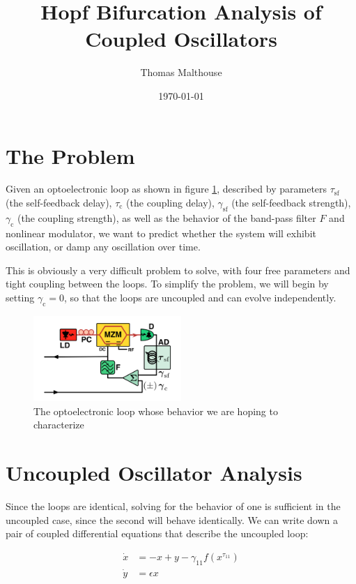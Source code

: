 \documentclass{article}
\title{Hopf Bifurcation Analysis of Coupled Oscillators}
\author{Thomas Malthouse}
\date{\today}
\newcommand{\self}{{\text{sf}}}
\begin{document}
    \maketitle

    \tableofcontents

    \section{The Problem}

    Given an optoelectronic loop as shown in figure \ref{oeloop}, described by parameters $\tau_{\self}$ (the self-feedback delay), $\tau_\text{c}$ (the coupling delay), $\gamma_{\self}$ (the self-feedback strength), $\gamma_\text{c}$ (the coupling strength), as well as the behavior of the band-pass filter $F$ and nonlinear modulator, we want to predict whether the system will exhibit oscillation, or damp any oscillation over time.

    This is obviously a very difficult problem to solve, with four free parameters and tight coupling between the loops. To simplify the problem, we will begin by setting $\gamma_{\text{c}}=0$, so that the loops are uncoupled and can evolve independently.

    \begin{figure}[t]
        \centering
        \includegraphics[width=0.5\textwidth]{figs/oeloop.png}
        \caption{The optoelectronic loop whose behavior we are hoping to characterize}
        \label{oeloop}
    \end{figure}

    \section{Uncoupled Oscillator Analysis}\label{uncoupledanalysis}

    Since the loops are identical, solving for the behavior of one is sufficient in the uncoupled case, since the second will behave identically. We can write down a pair of coupled differential equations that describe the uncoupled loop:

    \begin{equation}
        \begin{aligned}
            \dot{x} &= -x + y - \gamma_{11}f(x^{\tau_{11}}) \\
            \dot{y} &= \epsilon x
        \end{aligned}
    \end{equation}
\end{document}
